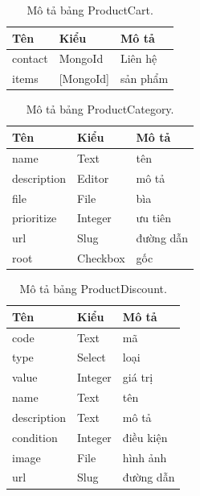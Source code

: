 \documentclass[11pt]{report}
\begin{document}
	
	\begin{table}[h!]
		\begin{center}
			\caption{Mô tả bảng ProductCart.}
			\begin{tabular}{ |l|l|l| } 
				\hline
				Tên & Kiểu & Mô tả \\
				
				\hline
				contact & MongoId & Liên hệ\\
				items & [MongoId] & sản phẩm\\
				\hline
			\end{tabular}
			\label{table:ProductCart}
		\end{center}
	\end{table}
	
	
	\begin{table}[h!]
		\begin{center}
			\caption{Mô tả bảng ProductCategory.}
			\begin{tabular}{ |l|l|l| } 
				\hline
				Tên & Kiểu & Mô tả \\
				\hline
				name & Text & tên \\
				description & Editor & mô tả \\
				file & File & bìa \\
				prioritize & Integer & ưu tiên \\
				url & Slug & đường dẫn \\
				root & Checkbox & gốc \\
				\hline
			\end{tabular}
			\label{table:ProductCategory}
		\end{center}
	\end{table}
	
	
	\begin{table}[h!]
		\begin{center}
			\caption{Mô tả bảng ProductDiscount.}
			\begin{tabular}{ |l|l|l| } 
				\hline
				Tên & Kiểu & Mô tả \\
				\hline
				code & Text & mã \\
				type & Select & loại \\
				value & Integer & giá trị \\
				name & Text & tên \\
				description & Text & mô tả \\
				condition & Integer & điều kiện \\
				image & File & hình ảnh \\
				url & Slug & đường dẫn \\
				\hline
			\end{tabular}
			\label{table:ProductDiscount}
		\end{center}
	\end{table}
	
\end{document}
